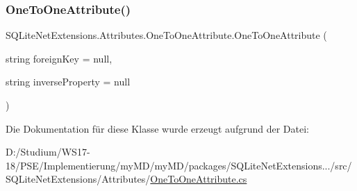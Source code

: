 \subsubsection{\texorpdfstring{One\+To\+One\+Attribute()}{OneToOneAttribute()}}
{\footnotesize\ttfamily S\+Q\+Lite\+Net\+Extensions.\+Attributes.\+One\+To\+One\+Attribute.\+One\+To\+One\+Attribute (\begin{DoxyParamCaption}\item[{string}]{foreign\+Key = {\ttfamily null},  }\item[{string}]{inverse\+Property = {\ttfamily null} }\end{DoxyParamCaption})}



Die Dokumentation für diese Klasse wurde erzeugt aufgrund der Datei\+:\begin{DoxyCompactItemize}
\item 
D\+:/\+Studium/\+W\+S17-\/18/\+P\+S\+E/\+Implementierung/my\+M\+D/my\+M\+D/packages/\+S\+Q\+Lite\+Net\+Extensions.../src/\+S\+Q\+Lite\+Net\+Extensions/\+Attributes/\mbox{\hyperlink{_one_to_one_attribute_8cs}{One\+To\+One\+Attribute.\+cs}}\end{DoxyCompactItemize}
